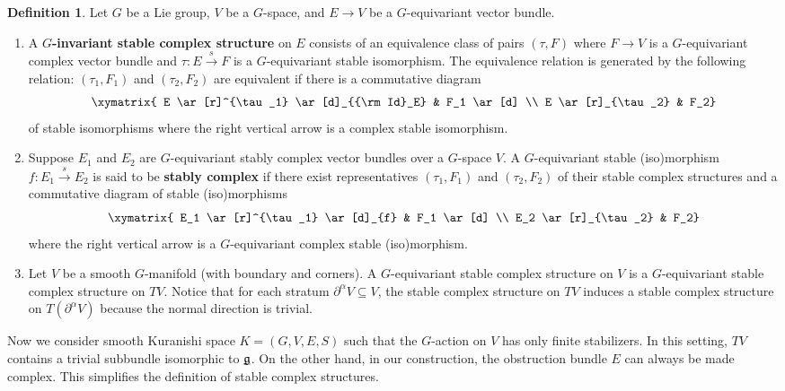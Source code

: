 \documentclass[reqno, 10pt]{amsart}
\numberwithin{equation}{section}
\numberwithin{equation}{section}
\renewcommand{\subset}{\subseteq}
\theoremstyle{definition}
\newtheorem{defn}[thm]{Definition}
\theoremstyle{remark}
\newcommand{\beqn}{\begin{equation*}}
\newcommand{\eeqn}{\end{equation*}}
\newcommand{\mf}{\mathfrak}
\newcommand{\uds}[1]{\underline{\smash{#1}}}
\begin{document}
\begin{defn}\label{defn_stable_complex_structure}
Let $G$ be a Lie group, $V$ be a $G$-space, and $E \to V$ be a $G$-equivariant vector bundle.
\begin{enumerate}


\item A {\bf $G$-invariant stable complex structure} on $E$ consists of an equivalence class of pairs $(\tau, F)$ where $F \to V$ is a  $G$-equivariant complex vector bundle and $\tau: E \overset{s}{\to} F$ is a $G$-equivariant stable isomorphism. The equivalence relation is generated by the following relation: $(\tau_1, F_1)$ and $(\tau_2, F_2)$ are equivalent if there is a commutative diagram
    \beqn
    \xymatrix{ E \ar[r]^{\tau_1} \ar[d]_{{\rm Id}_E}  &  F_1 \ar[d] \\
     E \ar[r]_{\tau_2} & F_2}
    \eeqn
    of stable isomorphisms where the right vertical arrow is a complex stable isomorphism.


\item Suppose $E_1$ and $E_2$ are $G$-equivariant stably complex vector bundles over a $G$-space $V$. A $G$-equivariant stable (iso)morphism $f: E_1 \overset{s}{\to} E_2$ is said to be {\bf stably complex} if there exist representatives $(\tau_1, F_1)$ and $(\tau_2, F_2)$ of their stable complex structures and a commutative diagram of stable (iso)morphisms
\beqn
\xymatrix{  E_1 \ar[r]^{\tau_1} \ar[d]_{f}  & F_1 \ar[d] \\
 E_2 \ar[r]_{\tau_2} & F_2}
\eeqn
where the right vertical arrow is a $G$-equivariant complex stable (iso)morphism.

\item Let $V$ be a smooth $G$-manifold (with boundary and corners). A $G$-equivariant stable complex structure on $V$ is a $G$-equivariant stable complex structure on $TV$. Notice that for each stratum $\partial^\alpha V \subset V$, the stable complex structure on $TV$ induces a stable complex structure on $T(\partial^\alpha V)$ because the normal direction is trivial. 
\end{enumerate}
\end{defn}


Now we consider smooth Kuranishi space $K = (G, V, E, S)$ such that the $G$-action on $V$ has only finite stabilizers. In this setting, $TV$ contains a trivial subbundle isomorphic to $\uds{\mf g}$. On the other hand, in our construction, the obstruction bundle $E$ can always be made complex. This simplifies the definition of stable complex structures. 
\end{document}

